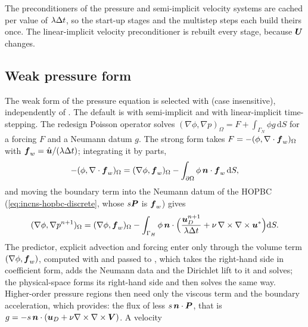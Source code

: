 The preconditioners of the pressure and semi-implicit velocity systems are
cached per value of $\lambda\Delta t$, so the start-up stages and the
multistep steps each build theirs once. The linear-implicit velocity
preconditioner is rebuilt every stage, because $\boldsymbol{U}$ changes.

\subsection{Weak pressure form}
\label{sec:incns-weak}

The weak form of the pressure equation is selected with
 (case insensitive), independently
of . The default is  with semi-implicit and
 with linear-implicit time-stepping. The redesign
Poisson operator solves $(\nabla\phi,\nabla p)_\Omega=F+\int_{\Gamma_N}\phi
g\,\mathrm dS$ for a forcing $F$ and a Neumann datum $g$. The strong form takes
$F=-(\phi,\nabla\cdot\boldsymbol{f}_w)_\Omega$ with
$\boldsymbol{f}_w=\hat{\boldsymbol{u}}/(\lambda\Delta t)$; integrating it by parts,
\begin{equation*}
  -(\phi,\nabla\cdot\boldsymbol{f}_w)_\Omega=(\nabla\phi,\boldsymbol{f}_w)_\Omega
  -\int_{\partial\Omega}\phi\,\boldsymbol{n}\cdot\boldsymbol{f}_w\,\mathrm dS ,
\end{equation*}
and moving the boundary term into the Neumann datum of the HOPBC
(\eqref{eq:incns-hopbc-discrete}, whose $s\boldsymbol{P}$ is $\boldsymbol{f}_w$) gives
\begin{equation}
  (\nabla\phi,\nabla p^{n+1})_\Omega = (\nabla\phi,\boldsymbol{f}_w)_\Omega
  - \int_{\Gamma_H}\phi\,\boldsymbol{n}\cdot\Bigl(
    \frac{\boldsymbol{u}_D^{n+1}}{\lambda\Delta t}
    + \nu\,\nabla\times\nabla\times\boldsymbol{u}^*\Bigr)\mathrm dS .
  \label{eq:incns-weak}
\end{equation}
The predictor, explicit advection and forcing enter only through the volume
term $(\nabla\phi,\boldsymbol{f}_w)$, computed with
 and passed to
, which takes the right-hand side in
coefficient form, adds the Neumann data and the Dirichlet lift to it and
solves; the physical-space  forms its right-hand side and then
solves the same way. Higher-order pressure regions then need only the viscous
term and the boundary acceleration, which
 provides: the flux of
 less $s\,\boldsymbol{n}\cdot\boldsymbol{P}$, that is
$g=-s\,\boldsymbol{n}\cdot(\boldsymbol{u}_D+\nu\nabla\times\nabla\times\boldsymbol{V})$. A velocity
